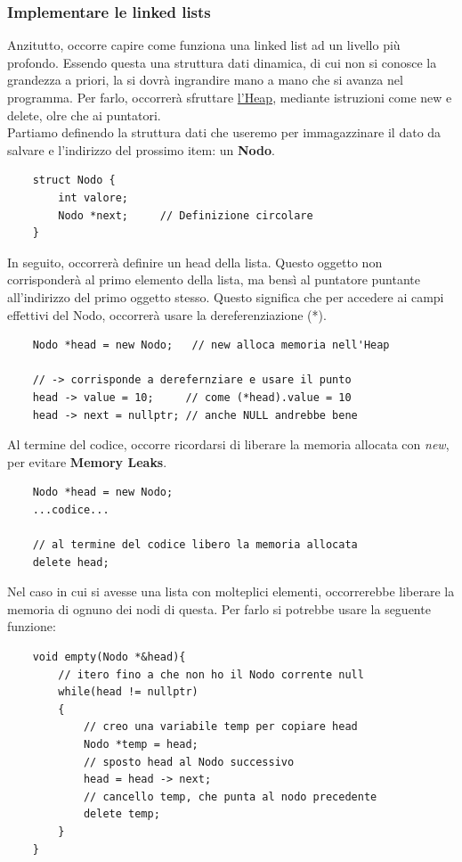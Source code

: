 \documentclass[12pt]{article}
\begin{document}
\subsubsection{Implementare le linked lists}
\label{sssec:linked_lists_implement}
Anzitutto, occorre capire come funziona una linked list ad un livello più profondo.
Essendo questa una struttura dati dinamica, di cui non si conosce la grandezza a priori, la si dovrà ingrandire mano a mano che si avanza nel programma.
Per farlo, occorrerà sfruttare \hyperref[sec:HEAP_STACK]{l'Heap}, mediante istruzioni come new e delete, olre che ai puntatori.
\\
Partiamo definendo la struttura dati che useremo per immagazzinare il dato da salvare e l'indirizzo del prossimo item: un \textbf{Nodo}.
\begin{lstlisting}
    struct Nodo {
        int valore;
        Nodo *next;     // Definizione circolare
    }
\end{lstlisting}
In seguito, occorrerà definire un head della lista.
Questo oggetto non corrisponderà al primo elemento della lista, ma bensì al puntatore puntante all'indirizzo del primo oggetto stesso.
Questo significa che per accedere ai campi effettivi del Nodo, occorrerà usare la dereferenziazione (*).
\begin{lstlisting}
    Nodo *head = new Nodo;   // new alloca memoria nell'Heap

    // -> corrisponde a derefernziare e usare il punto
    head -> value = 10;     // come (*head).value = 10
    head -> next = nullptr; // anche NULL andrebbe bene
\end{lstlisting}
Al termine del codice, occorre ricordarsi di liberare la memoria allocata con \textit{new}, per evitare \textbf{Memory Leaks}.
\begin{lstlisting}
    Nodo *head = new Nodo;
    ...codice...

    // al termine del codice libero la memoria allocata
    delete head;
\end{lstlisting}
Nel caso in cui si avesse una lista con molteplici elementi, occorrerebbe liberare la memoria di ognuno dei nodi di questa. Per farlo si potrebbe usare la seguente funzione:
\begin{lstlisting}
    void empty(Nodo *&head){
        // itero fino a che non ho il Nodo corrente null
        while(head != nullptr)
        {
            // creo una variabile temp per copiare head
            Nodo *temp = head;
            // sposto head al Nodo successivo
            head = head -> next;
            // cancello temp, che punta al nodo precedente
            delete temp;
        }
    }
\end{lstlisting}
\end{document}
